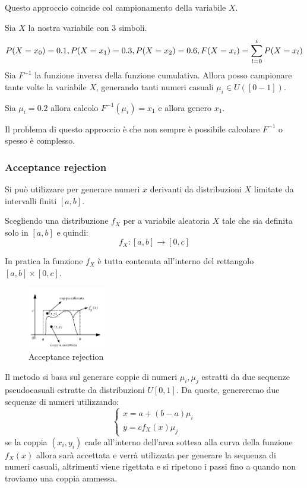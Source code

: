 Questo approccio coincide col campionamento della variabile $X$.
\begin{esempio}
    Sia $X$ la nostra variabile con $3$ simboli.
    \begin{equation*}
        P(X = x_0) = 0.1, \space P(X = x_1) = 0.3, \space P(X = x_2) = 0.6,
        F(X = x_i) = \sum_{l=0}^{i} P(X = x_l)
    \end{equation*}
    Sia $F^{-1}$ la funzione inversa della funzione cumulativa. Allora posso
    campionare tante volte la variabile $X$, generando tanti numeri casuali
    $\mu_i \in U([0-1])$.

    Sia $\mu_i = 0.2$ allora calcolo $F^{-1}(\mu_i) = x_1$ e allora genero $x_1$.
\end{esempio}
Il problema di questo approccio è che non sempre è possibile calcolare $F^{-1}$ o
spesso è complesso.
\subsubsection{Acceptance rejection}
Si può utilizzare per generare numeri $x$ derivanti da distribuzioni $X$ limitate
da intervalli finiti $[a,b]$.

Scegliendo una distribuzione $f_X$ per a variabile aleatoria $X$ tale che sia
definita solo in $[a,b]$ e quindi:
\begin{equation}
    f_X : [a,b] \rightarrow [0,c]
\end{equation}
\begin{osservazione}
    In pratica la funzione $f_X$ è tutta contenuta all'interno del rettangolo
    $[a,b] \times [0,c]$.
\end{osservazione}
\begin{figure}[!ht]
    \centering
    \includegraphics[width=0.3\textwidth]{./img/Reti/acceptancerejection.png}
    \caption{Acceptance rejection}
    \label{fig:acceptance-rejection}
\end{figure}
Il metodo si basa sul generare coppie di numeri $\mu_i,\mu_j$ estratti da due
sequenze pseudocasuali estratte da distribuzioni $U[0, 1]$. Da queste, genereremo
due sequenze di numeri utilizzando:
\begin{equation}
    \begin{cases}
        x = a + (b-a)\mu_i \\
        y = cf_X(x)\mu_j
    \end{cases}
\end{equation}
se la coppia $(x_i, y_i)$ cade all'interno dell'area sottesa alla curva della
funzione $f_X(x)$ allora sarà accettata e verrà utilizzata per generare la sequenza
di numeri casuali, altrimenti viene rigettata e si ripetono i passi fino a quando
non troviamo una coppia ammessa.